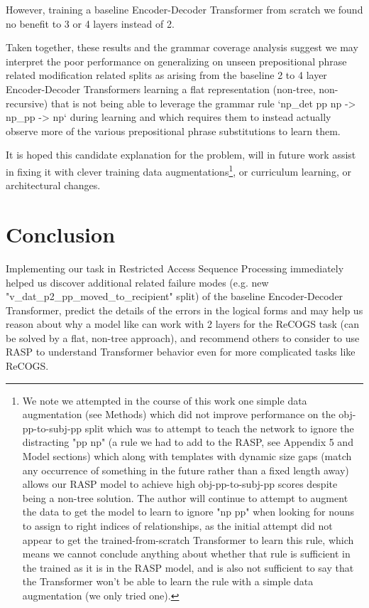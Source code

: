 \documentclass[11pt]{article}
\begin{document}
However, training a \cite{Wu2023} baseline Encoder-Decoder Transformer from scratch we found no benefit to 3 or 4 layers instead of 2.

Taken together, these results and the grammar coverage analysis suggest we may interpret the poor performance on generalizing on unseen prepositional phrase related modification related splits as arising from the baseline 2 to 4 layer Encoder-Decoder Transformers learning a flat representation (non-tree, non-recursive) that is not being able to leverage the grammar rule `np\_det pp np -> np\_pp -> np` during learning and which requires them to instead actually observe more of the various prepositional phrase substitutions to learn them.

It is hoped this candidate explanation for the problem, will in future work assist in fixing it with clever training data augmentations\footnote{
We note we attempted in the course of this work one simple data augmentation (see Methods) which did not improve performance on the obj-pp-to-subj-pp split which was to attempt to teach the network to ignore the distracting "pp np" (a rule we had to add to the RASP, see Appendix 5 and Model sections) which along with templates with dynamic size gaps (match any occurrence of something in the future rather than a fixed length away) allows our RASP model to achieve high obj-pp-to-subj-pp scores despite being a non-tree solution. The author will continue to attempt to augment the data to get the model to learn to ignore "np pp" when looking for nouns to assign to right indices of relationships, as the initial attempt did not appear to get the trained-from-scratch Transformer to learn this rule, which means we cannot conclude anything about whether that rule is sufficient in the trained as it is in the RASP model, and is also not sufficient to say that the Transformer won't be able to learn the rule with a simple data augmentation (we only tried one).
}, or curriculum learning, or architectural changes.

\section{Conclusion} 

Implementing our task in Restricted Access Sequence Processing immediately helped us discover additional related failure modes (e.g. new "v\_dat\_p2\_pp\_moved\_to\_recipient" split) of the baseline Encoder-Decoder Transformer, predict the details of the errors in the logical forms and may help us reason about why a model like \cite{Wu2023} can work with 2 layers for the ReCOGS task (can be solved by a flat, non-tree approach), and recommend others to consider to use RASP to understand Transformer behavior even for more complicated tasks like ReCOGS.
\end{document}
